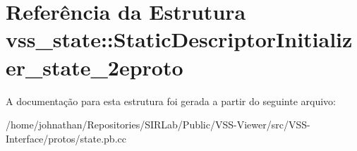 \hypertarget{structvss__state_1_1StaticDescriptorInitializer__state__2eproto}{}\section{Referência da Estrutura vss\+\_\+state\+:\+:Static\+Descriptor\+Initializer\+\_\+state\+\_\+2eproto}
\label{structvss__state_1_1StaticDescriptorInitializer__state__2eproto}


A documentação para esta estrutura foi gerada a partir do seguinte arquivo\+:\begin{DoxyCompactItemize}
\item 
/home/johnathan/\+Repositories/\+S\+I\+R\+Lab/\+Public/\+V\+S\+S-\/\+Viewer/src/\+V\+S\+S-\/\+Interface/protos/state.\+pb.\+cc\end{DoxyCompactItemize}
